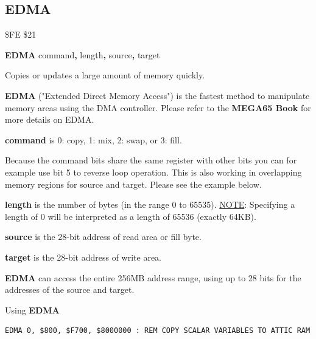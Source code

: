\subsection{EDMA}
\label{BASIC 65 Commands!EDMA}
\begin{description}[leftmargin=2cm,style=nextline]
\item [Token:]    \$FE \$21

\item [Format:]   {\bf EDMA} command{\bf,} length{\bf,} source{\bf,} target

\item [Usage:]    Copies or updates a large amount of memory quickly.

                  {\bf EDMA} ("Extended Direct Memory Access") is the fastest method to manipulate memory areas using the DMA controller. Please refer to
                  \ifdefined\printmanual
                     the {\bf MEGA65 Book}
                  \else
                  \fi
                  for more details on EDMA.

                  {\bf command} is 0: copy, 1: mix, 2: swap, or 3: fill.

                  Because the command bits share the same register with other bits you can for example use bit 5 to reverse loop operation. This is also working in overlapping memory regions for source and target. Please see the example below.

                  {\bf length} is the number of bytes (in the range 0 to 65535). \underline{NOTE}: Specifying a length of 0 will be interpreted as a length of 65536 (exactly 64KB).

                  {\bf source} is the 28-bit address of read area or fill byte.

                  {\bf target} is the 28-bit address of write area.

\item [Remarks:]  {\bf EDMA} can access the entire 256MB address range, using up to 28 bits for the addresses of the source and target.

\item [Examples:] Using {\bf EDMA}

\begin{tcolorbox}[colback=black,coltext=white]
\verbatimfont{\codefont}
\begin{verbatim}
EDMA 0, $800, $F700, $8000000 : REM COPY SCALAR VARIABLES TO ATTIC RAM


\end{verbatim}
\end{tcolorbox}
\end{description}
